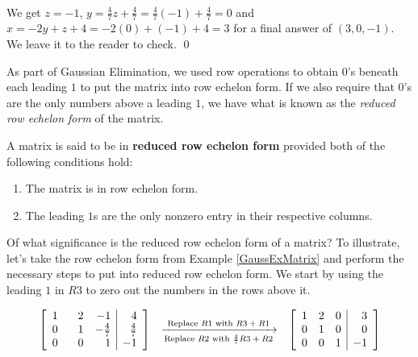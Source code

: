 \begin{ex}
\[\begin{array}{ccc}
\end{array}\]

We get $z=-1$,  $y = \frac{4}{7} z + \frac{4}{7} = \frac{4}{7}(-1)+\frac{4}{7} = 0$ and $x = -2y+z+4 = -2(0)+(-1)+4 = 3$ for a final answer of $(3,0,-1)$.  We leave it to the reader to check. \qed

\end{ex}

As part of Gaussian Elimination, we used row operations to obtain $0$'s beneath each leading $1$ to put the matrix into row echelon form.  If we also require that $0$'s are the only numbers above a leading $1$, we have what is known as  the   \textit{reduced row echelon form} of the matrix.

\smallskip

\colorbox{ResultColor}{\bbm  

\begin{defn} \label{reducedrowechelonform} A matrix is said to be in \textbf{reduced row echelon form} provided both of the following conditions hold:

\begin{enumerate}

\item  The matrix is in row echelon form.

\item The leading $1$s are the only nonzero entry in their respective columns.

\end{enumerate}

\end{defn}

\ebm}

\smallskip

Of what significance is the reduced row echelon form of a matrix?  To illustrate, let's take the row echelon form from Example \ref{GaussExMatrix} and perform the necessary steps to put into reduced row echelon form.  We start by using the leading $1$ in $R3$ to zero out the numbers in the rows above it.

\[ \begin{array}{ccc}

\left[ \begin{array}{rrr|r} 
1 & \hphantom{-}2 & -1 & 4 \\ 
0 & 1 & -\frac{4}{7} & \frac{4}{7} \\ 
0 & 0 &1 & -1 \\ 
\end{array} \right]  
& 
\xrightarrow[\text{Replace $R2$ with $\frac{4}{7} R3 + R2$}]{\text{Replace $R1$ with $R3+R1$}} 
& 
\left[ \begin{array}{rrr|r} 
1 & 2 & 0 & 3 \\ 
0 & 1 & 0 & 0 \\ 
0 & 0 &1 & -1 \\ 
\end{array} \right]  

\end{array}\]

